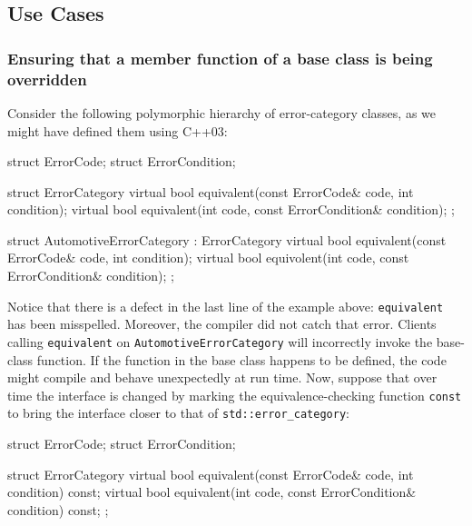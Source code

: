 \subsection[Use Cases]{Use Cases}\label{use-cases}

\subsubsection[Ensuring that a member function of a base class is being overridden]{Ensuring that a member function of a base class is being overridden}\label{ensuring-that-a-member-function-of-a-base-class-is-being-overridden}

Consider the following polymorphic hierarchy of error-category classes, as we might have defined them using C++03:

\begin{emcppshiddenlisting}[emcppsbatch=e1]
struct ErrorCode;
struct ErrorCondition;
\end{emcppshiddenlisting}
\begin{emcppslisting}[emcppsbatch=e1]
struct ErrorCategory
{
    virtual bool equivalent(const ErrorCode& code, int condition);
    virtual bool equivalent(int code, const ErrorCondition& condition);
};

struct AutomotiveErrorCategory : ErrorCategory
{
    virtual bool equivalent(const ErrorCode& code, int condition);
    virtual bool equivolent(int code, const ErrorCondition& condition);
};
\end{emcppslisting}

\noindent Notice that there is a defect in the last line of the example above:
\lstinline!equivalent! has been misspelled. Moreover, the compiler did not
catch that error. Clients calling \lstinline!equivalent! on
\lstinline!AutomotiveErrorCategory! will incorrectly invoke the base-class
function. If the function in the base class happens to be defined, the
code might compile and behave unexpectedly at run time. Now, suppose
that over time the interface is changed by marking the
equivalence-checking function \lstinline!const! to bring the interface
closer to that of \lstinline!std::error_category!:

\begin{emcppshiddenlisting}[emcppsbatch=e2]
struct ErrorCode;
struct ErrorCondition;
\end{emcppshiddenlisting}
\begin{emcppslisting}[emcppsbatch=e2]
struct ErrorCategory
{
    virtual bool equivalent(const ErrorCode& code, int condition) const;
    virtual bool equivalent(int code, const ErrorCondition& condition) const;
};
\end{emcppslisting}


